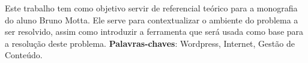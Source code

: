 \documentclass[
	12pt,				%
	openright,			%
	twoside,			%
	a4paper,			%
	Times,
	brazil,				%
	]{abntex2}
\begin{document}
%
%


















\setlength{\absparsep}{18pt} %
\begin{resumo}
 Este trabalho tem como objetivo servir de referencial teórico para a monografia do aluno Bruno Motta. Ele serve para contextualizar o ambiente do problema a ser resolvido, assim como introduzir a ferramenta que será usada como base para a resolução deste problema.
 \textbf{Palavras-chaves}: Wordpress, Internet, Gestão de Conteúdo.
\end{resumo}
\end{document}
